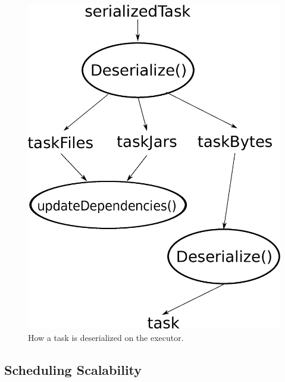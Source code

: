 \begin{figure}[t!]
  \begin{center}
    \includegraphics[scale=0.30]{deserialization.eps}
  \end{center}
  \caption{How a task is deserialized on the executor. }
  \label{fig:deserialization}
\end{figure}

\subsection{Scheduling Scalability}

